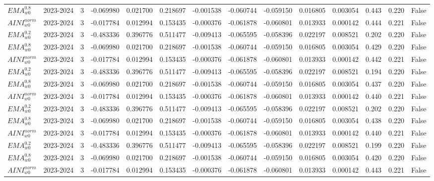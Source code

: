 \begin{tabular}{@{}llrrrrrrrrrlll@{}}
$EMA^{0.8}_{w0}$ & 2023-2024 & 3 & -0.069980 & 0.021700 & 0.218697 & -0.001538 & -0.060744 & -0.059150 & 0.016805 & 0.003054 & 0.443 & 0.220 & False \\
$AINI^{norm}_{w0}$ & 2023-2024 & 3 & -0.017784 & 0.012994 & 0.153435 & -0.000376 & -0.061878 & -0.060801 & 0.013933 & 0.000142 & 0.444 & 0.221 & False \\
$EMA^{0.2}_{w0}$ & 2023-2024 & 3 & -0.483336 & 0.396776 & 0.511477 & -0.009413 & -0.065595 & -0.058396 & 0.022197 & 0.008521 & 0.202 & 0.220 & False \\
$EMA^{0.8}_{w0}$ & 2023-2024 & 3 & -0.069980 & 0.021700 & 0.218697 & -0.001538 & -0.060744 & -0.059150 & 0.016805 & 0.003054 & 0.429 & 0.220 & False \\
$AINI^{norm}_{w0}$ & 2023-2024 & 3 & -0.017784 & 0.012994 & 0.153435 & -0.000376 & -0.061878 & -0.060801 & 0.013933 & 0.000142 & 0.442 & 0.221 & False \\
$EMA^{0.2}_{w0}$ & 2023-2024 & 3 & -0.483336 & 0.396776 & 0.511477 & -0.009413 & -0.065595 & -0.058396 & 0.022197 & 0.008521 & 0.194 & 0.220 & False \\
$EMA^{0.8}_{w0}$ & 2023-2024 & 3 & -0.069980 & 0.021700 & 0.218697 & -0.001538 & -0.060744 & -0.059150 & 0.016805 & 0.003054 & 0.437 & 0.220 & False \\
$AINI^{norm}_{w0}$ & 2023-2024 & 3 & -0.017784 & 0.012994 & 0.153435 & -0.000376 & -0.061878 & -0.060801 & 0.013933 & 0.000142 & 0.440 & 0.221 & False \\
$EMA^{0.2}_{w0}$ & 2023-2024 & 3 & -0.483336 & 0.396776 & 0.511477 & -0.009413 & -0.065595 & -0.058396 & 0.022197 & 0.008521 & 0.202 & 0.220 & False \\
$EMA^{0.8}_{w0}$ & 2023-2024 & 3 & -0.069980 & 0.021700 & 0.218697 & -0.001538 & -0.060744 & -0.059150 & 0.016805 & 0.003054 & 0.438 & 0.220 & False \\
$AINI^{norm}_{w0}$ & 2023-2024 & 3 & -0.017784 & 0.012994 & 0.153435 & -0.000376 & -0.061878 & -0.060801 & 0.013933 & 0.000142 & 0.440 & 0.221 & False \\
$EMA^{0.2}_{w0}$ & 2023-2024 & 3 & -0.483336 & 0.396776 & 0.511477 & -0.009413 & -0.065595 & -0.058396 & 0.022197 & 0.008521 & 0.199 & 0.220 & False \\
$EMA^{0.8}_{w0}$ & 2023-2024 & 3 & -0.069980 & 0.021700 & 0.218697 & -0.001538 & -0.060744 & -0.059150 & 0.016805 & 0.003054 & 0.420 & 0.220 & False \\
$AINI^{norm}_{w0}$ & 2023-2024 & 3 & -0.017784 & 0.012994 & 0.153435 & -0.000376 & -0.061878 & -0.060801 & 0.013933 & 0.000142 & 0.443 & 0.221 & False \\

\end{tabular}
